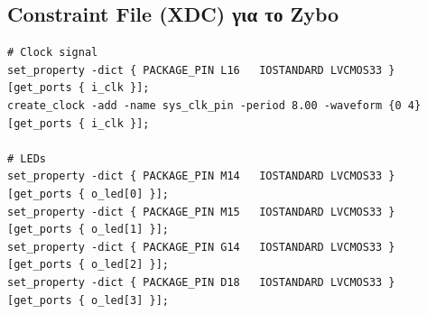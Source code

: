 \documentclass[12pt]{article}
\begin{document}
\subsection*{Constraint File (XDC) για το Zybo}
\begin{lstlisting}
# Clock signal
set_property -dict { PACKAGE_PIN L16   IOSTANDARD LVCMOS33 } [get_ports { i_clk }];
create_clock -add -name sys_clk_pin -period 8.00 -waveform {0 4} [get_ports { i_clk }];

# LEDs
set_property -dict { PACKAGE_PIN M14   IOSTANDARD LVCMOS33 } [get_ports { o_led[0] }]; 
set_property -dict { PACKAGE_PIN M15   IOSTANDARD LVCMOS33 } [get_ports { o_led[1] }];
set_property -dict { PACKAGE_PIN G14   IOSTANDARD LVCMOS33 } [get_ports { o_led[2] }];
set_property -dict { PACKAGE_PIN D18   IOSTANDARD LVCMOS33 } [get_ports { o_led[3] }];
\end{lstlisting}
\end{document}
